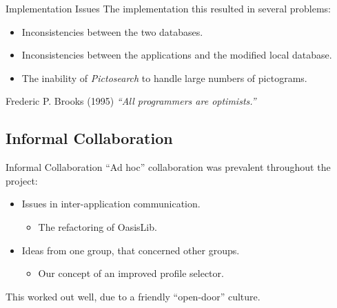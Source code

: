 \begin{frame}{Implementation Issues}
	The implementation this resulted in several problems:
	\begin{itemize}
		\item<1,4> Inconsistencies between the two databases.
		\item<2,4> Inconsistencies between the applications and the modified local database.
		\item<3,4> The inability of \textit{Pictosearch} to handle large numbers of pictograms.
	\end{itemize}
	\pause[4]
	\begin{block}{Frederic P. Brooks (1995)}
    	\textit{``All programmers are optimists.''}
   	\end{block}
\end{frame}


\subsection{Informal Collaboration}

\begin{frame}{Informal Collaboration}
	``Ad hoc'' collaboration was prevalent throughout the project:
	\begin{itemize}
		\item<1> Issues in inter-application communication.
		\begin{itemize}
			\item<1> The refactoring of OasisLib.
		\end{itemize}
		\item<2> Ideas from one group, that concerned other groups.
		\begin{itemize}
			\item<2> Our concept of an improved profile selector.
		\end{itemize}
	\end{itemize}
	\vspace{\baselineskip}
	\pause[3]
	This worked out well, due to a friendly ``open-door'' culture.
\end{frame}


